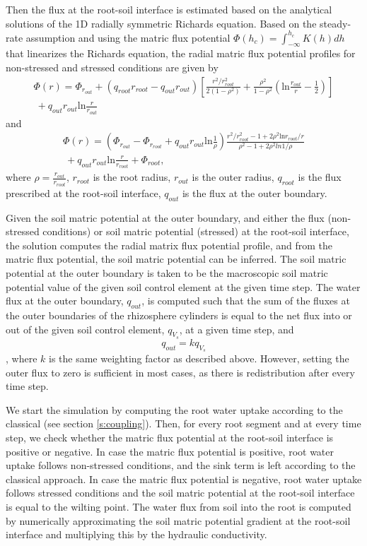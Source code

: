 Then the flux at the root-soil interface is estimated based on the analytical solutions of the 1D radially symmetric Richards equation. Based on the steady-rate assumption and using the matric flux potential $\Phi(h_c)=\int_{-\infty}^{h_c}  K(h) dh$ that linearizes the Richards equation, the radial matric flux potential profiles for non-stressed and stressed conditions are given by 
\begin{multline}
\Phi(r)=\Phi_{r_{out}} + (q_{root}r_{root}-q_{out}r_{out})\left[ \frac{r^2/r_{root}^2}{2(1-\rho^2)} + \frac{\rho^2}{1-\rho^2}\left(\text{ln}  \frac{r_{out}}{r}-\frac{1}{2} \right) \right] \\\ + q_{out}r_{out} \text{ln} \frac{r}{r_{out}}
\end{multline}
and 
\begin{multline}
\Phi(r) = \left(\Phi_{r_{out}} - \Phi_{r_{root}} + q_{out}r_{out}\text{ln} \frac{1}{\rho}\right)\frac{r^2/r_{root}^2 - 1 + 2\rho^2 \text{ln}  r_{root}/r}{\rho^2 -1 + 2\rho^2 ln 1/\rho} \\\ + q_{out}r_{out}\text{ln} \frac{r}{r_{root}} + \Phi_{root},
\end{multline}
where $\rho=\frac{r_{out}}{r_{root}}$, $r_{root}$ is the root radius, $r_{out}$ is the outer radius, $q_{root}$ is the flux prescribed at the root-soil interface, $q_{out}$ is the flux at the outer boundary.

Given the soil matric potential at the outer boundary, and either the flux (non-stressed conditions) or soil matric potential (stressed) at the root-soil interface, the solution computes the radial matrix flux potential profile, and from the matric flux potential, the soil matric potential can be inferred. The soil matric potential at the outer boundary is taken to be the macroscopic soil matric potential value of the given soil control element at the given time step. The water flux at the outer boundary, $q_{out}$, is computed such that the sum of the fluxes at the outer boundaries of the rhizosphere cylinders is equal to the net flux into or out of the given soil control element, $q_{V_s}$, at a given time step, and $$q_{out}=k q_{V_s}$$, where $k$ is the same weighting factor as described above. However, setting the outer flux to zero is sufficient in most cases, as there is redistribution after every time step.  

We start the simulation by computing the root water uptake according to the classical (see section \ref{s:coupling}). 
Then, for every root segment and at every time step, we check whether the matric flux potential at the root-soil interface is positive or negative. In case the matric flux potential is positive, root water uptake follows non-stressed conditions, and the sink term is left according to the classical approach. In case the matric flux potential is negative, root water uptake follows stressed conditions and the soil matric potential at the root-soil interface is equal to the wilting point. The water flux from soil into the root is computed by numerically approximating the soil matric potential gradient at the root-soil interface and multiplying this by the hydraulic conductivity.

